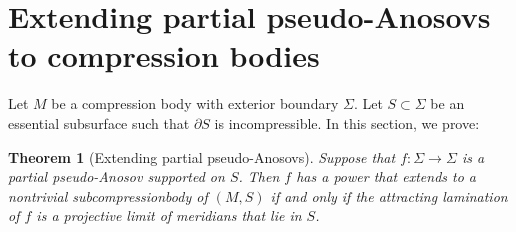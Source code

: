 \documentclass[12pt]{amsart}
\newtheorem{theorem}{Theorem}[section] \newtheorem{philosophy}{Statement}[theorem]
\theoremstyle{definition}
\newtheorem{example}[theorem]{Example}
\theoremstyle{remark}
\newcommand{\PML}{{\mathcal P \mathcal M \mathcal L}}
\begin{document}
%
%
%
%
%
%



%
\section{Extending partial pseudo-Anosovs to compression bodies}

Let $M $ be a compression body with exterior boundary $\Sigma$. Let $S\subset \Sigma$ be an essential subsurface such that $\partial S$ is incompressible. In this section, we prove:

\begin{theorem}[Extending partial pseudo-Anosovs]\label{BJM}
	Suppose that $f : \Sigma \longrightarrow \Sigma$ is a partial pseudo-Anosov supported on $S$. Then $f$ has a power that extends to a nontrivial subcompressionbody of $(M,S)$ if and only if the attracting lamination of $f$ is a projective limit of meridians that lie in $S$.
\end{theorem}
\end{document}
